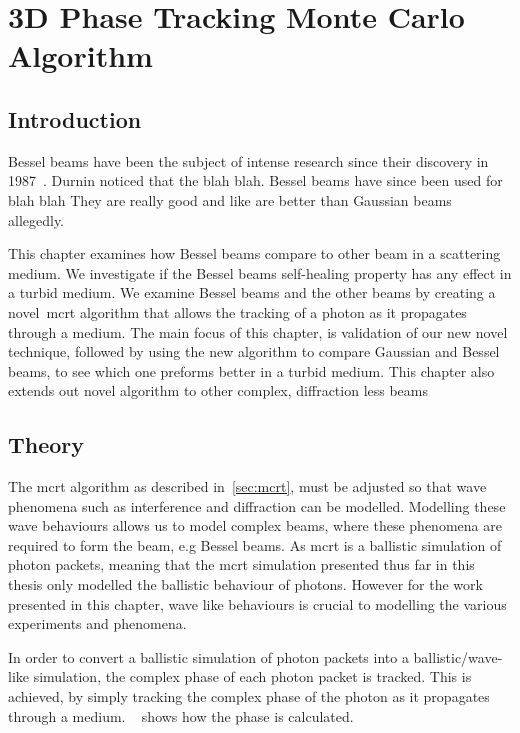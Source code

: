 \chapter{3D Phase Tracking Monte Carlo Algorithm}\label{sec:phase}

\section{Introduction}\label{sec:besintro}

Bessel beams have been the subject of intense research since their discovery in 1987~\cite{durnin1987diffraction,durnin1987exact}. Durnin noticed that the blah blah.
Bessel beams have since been used for blah blah
They are really good and like are better than Gaussian beams allegedly.

This chapter examines how Bessel beams compare to other beam in a scattering medium. 
We investigate if the Bessel beams self-healing property has any effect in a turbid medium.
We examine Bessel beams and the other beams by creating a novel~\gls{mcrt} algorithm that allows the tracking of a photon as it propagates through a medium. 
The main focus of this chapter, is validation of our new novel technique, followed by using the new algorithm to compare Gaussian and Bessel beams, to see which one preforms better in a turbid medium. 
This chapter also extends out novel algorithm to other complex, diffraction less beams

\section{Theory}\label{sec:bestheory}

The \gls{mcrt} algorithm as described in~\cref{sec:mcrt}, must be adjusted so that wave phenomena such as interference and diffraction can be modelled. 
Modelling these wave behaviours allows us to model complex beams, where these phenomena are required to form the beam, e.g Bessel beams. 
As \gls{mcrt} is a ballistic simulation of photon packets, meaning that the \gls{mcrt} simulation presented thus far in this thesis only modelled the ballistic behaviour of photons. 
However for the work presented in this chapter, wave like behaviours is crucial to modelling the various experiments and phenomena.

In order to convert a ballistic simulation of photon packets into a ballistic/wave-like simulation, the complex phase of each photon packet is tracked.
This is achieved, by simply tracking the complex phase of the photon as it propagates through a medium.
~ shows how the phase is calculated.

